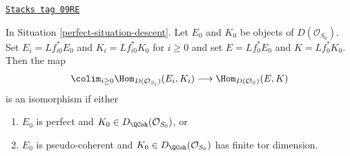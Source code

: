 \begin{lemma}
\label{perfect-lemma-descend-homomorphisms}
\href{https://stacks.math.columbia.edu/tag/09RE}{\texttt{Stacks tag 09RE}}

In Situation \ref{perfect-situation-descent}.
Let $E_0$ and $K_0$ be objects of
$D(\mathcal{O}_{S_0})$.
Set $E_i = Lf_{i0}^*E_0$ and $K_i = Lf_{i0}^*K_0$ for $i \geq 0$
and set $E = Lf_0^*E_0$ and $K = Lf_0^*K_0$. Then the map
$$
\colim_{i \geq 0} \Hom_{D(\mathcal{O}_{S_i})}(E_i, K_i)
\longrightarrow
\Hom_{D(\mathcal{O}_S)}(E, K)
$$
is an isomorphism if either
\begin{enumerate}
\item $E_0$ is perfect and $K_0 \in D_\QCoh(\mathcal{O}_{S_0})$, or
\item $E_0$ is pseudo-coherent and
$K_0 \in D_\QCoh(\mathcal{O}_{S_0})$ has finite tor dimension.
\end{enumerate}
\end{lemma}

